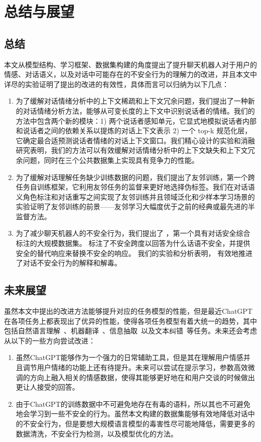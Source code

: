 \chapter{总结与展望}
\section{总结}
本文从模型结构、学习框架、数据集构建的角度提出了提升聊天机器人对于用户的情感、对话语义，以及对话中可能存在的不安全行为的理解力的改进，并且本文中详尽的实验证明了提出的改进的有效性，具体而言可以归纳为以下几点：
\begin{enumerate}
		\item 为了缓解对话情绪分析中的上下文稀疏和上下文冗余问题，我们提出了一种新的对话情绪分析方法，能够从可变长度的上下文中识别说话者的情绪。我们的方法中包含两个新的模块：1) 两个说话者感知单元，它显式地模拟说话者内部和说话者之间的依赖关系以提炼的对话上下文表示 2) 一个 top-k 规范化层，它确定最合适预测说话者情绪的对话上下文窗口。我们精心设计的实验和消融研究表明，我们的方法可以有效缓解对话情绪分析中的上下文缺失和上下文冗余问题，同时在三个公共数据集上实现具有竞争力的性能。
		      
		\item 为了缓解对话理解任务缺少训练数据的问题，我们提出了友邻训练，第一个跨任务自训练框架，它利用友邻任务的监督来更好地选择伪标签。我们在对话语义角色标注和对话重写之间实现了友邻训练并且领域泛化和少样本学习场景的实验证明了友邻训练的前景——友邻学习大幅度优于之前的经典或最先进的半监督方法。
		      
		\item 为了减少聊天机器人的不安全行为，我们提出了 \data{}，第一个具有对话安全综合标注的大规模数据集。 \data{} 标注了不安全跨度以回答为什么话语不安全，并提供安全的替代响应来替换不安全的响应。 我们的实验和分析表明，\data{} 有效地推进了对话不安全行为的解释和解毒。
  
\end{enumerate}
        
\section{未来展望}
虽然本文中提出的改进方法能够提升对应的任务模型的性能，但是最近ChatGPT在各项任务上都表现出了优异的性能，使得各项任务模型有着大统一的趋势，其中包括自然语言理解~\cite{chen2023robust}、机器翻译~\cite{bang2023multitask}、信息抽取~\cite{wei2023zero}以及文本纠错~\cite{wuchatgpt}等任务。未来还会考虑从以下的一些方向尝试改进：
\begin{enumerate}
    \item 虽然ChatGPT能够作为一个强力的日常辅助工具，但是其在理解用户情感并且调节用户情绪的功能上还有待提升。未来可以尝试在提示学习，参数高效微调的方向上融入相关的情感数据，使得其能够更好地在和用户交谈的时候做出更让人接受的回答。
    \item 由于ChatGPT的训练数据中不可避免地存在有毒的语料，所以其也不可避免地会学习到一些不安全的行为。虽然本文构建的\data{}数据集能够有效地降低对话中的不安全行为，但是要想大规模语言模型的毒害性尽可能地降低，需要更多的数据清洗，不安全行为检测，以及模型优化的方法。
\end{enumerate}